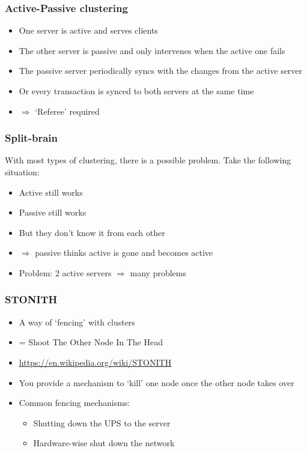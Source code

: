 \documentclass{article}
\begin{document}
\subsubsection{Active-Passive clustering}

\begin{itemize}
    \item One server is active and serves clients
    \item The other server is passive and only intervenes when the active one fails
    \item The passive server periodically syncs with the changes from the active server
    \item Or every transaction is synced to both servers at the same time
    \item $\Rightarrow$ `Referee' required
\end{itemize}

\subsubsection{Split-brain}

With most types of clustering, there is a possible problem. Take the following situation:

\begin{itemize}
    \item Active still works
    \item Passive still works
    \item But they don't know it from each other
    \item $\Rightarrow$ passive thinks active is gone and becomes active
    \item Problem: 2 active servers $\Rightarrow$ many problems
\end{itemize}

\subsubsection{STONITH}

\begin{itemize}
    \item A way of `fencing' with clusters
    \item = Shoot The Other Node In The Head
    \item \url{https://en.wikipedia.org/wiki/STONITH}
    \item You provide a mechanism to `kill' one node once the other node takes over
    \item Common fencing mechanisms:
    \begin{itemize}
        \item Shutting down the UPS to the server
        \item Hardware-wise shut down the network
    \end{itemize}
\end{itemize}
\end{document}
